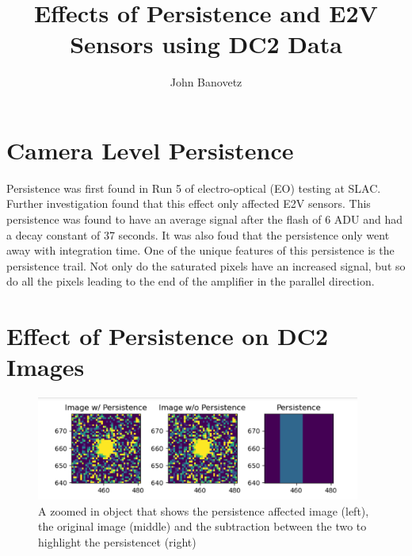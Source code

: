 \documentclass[DM,authoryear,toc]{lsstdoc}
\title{Effects of Persistence and E2V Sensors using DC2 Data}
\author{%
John Banovetz
}
\date{\vcsDate}
\begin{document}
\maketitle


\section{Camera Level Persistence}
Persistence was first found in Run 5 of electro-optical (EO) testing at SLAC. Further investigation found that this effect only affected E2V sensors. 
This persistence was found to have an average signal after the flash of 6 ADU and had a decay constant of 37 seconds. 
It was also foud that the persistence only went away with integration time. One of the unique features of this persistence is the persistence trail. 
Not only do the saturated pixels have an increased signal, but so do all the pixels leading to the end of the amplifier in the parallel direction.


\section{Effect of Persistence on DC2 Images}

\begin{figure}[!htp]
  \centering
  \includegraphics[width=0.95\textwidth, angle=0]{Obj_pers.png}
  \caption{
  A zoomed in object that shows the persistence affected image (left), the original image (middle) 
  and the subtraction between the two to highlight the persistencet (right)
  }
\label{fig:ex_persistence}
\end{figure}
\end{document}
